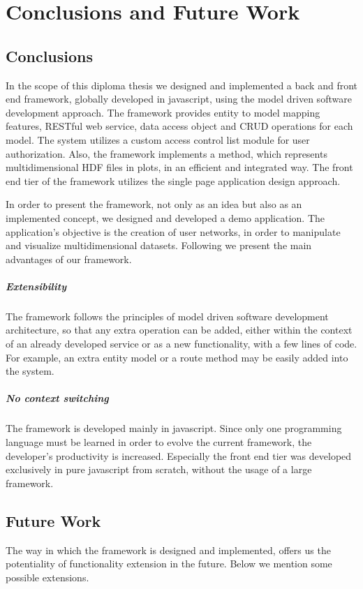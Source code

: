 \chapter{Conclusions and Future Work}
\label{chapter7_cf}
\section{Conclusions}
In the scope of this diploma thesis we designed and implemented a back and front end framework, globally developed in javascript, using the model driven software development approach. The framework provides entity to model mapping features, RESTful web service, data access object and CRUD operations for each model. The system utilizes a custom access control list module for user authorization. Also, the framework implements a method, which represents multidimensional HDF files in plots, in an efficient and integrated way. The front end tier of the framework utilizes the single page application design approach. \par 
	In order to present the framework, not only as an idea but also as an implemented concept, we designed and developed a demo application. The application's objective is the creation of user networks, in order to manipulate and visualize multidimensional datasets. Following we present the main advantages of our framework.

\paragraph{Extensibility} The framework follows the principles of model driven software development architecture, so that any extra operation can be added, either within the context of an already developed service or as a new functionality, with a few lines of code. For example, an extra entity model or a route method may be easily added into the system.
	

\paragraph{No context switching} The framework is developed mainly in javascript. Since only one programming language must be learned in order to evolve the current framework, the developer's productivity is increased. Especially the front end tier was developed exclusively in pure javascript from scratch, without the usage of a large framework.


\section{Future Work}
The way in which the framework is designed and implemented, offers us the potentiality of functionality extension in the future. Below we mention some possible extensions.

